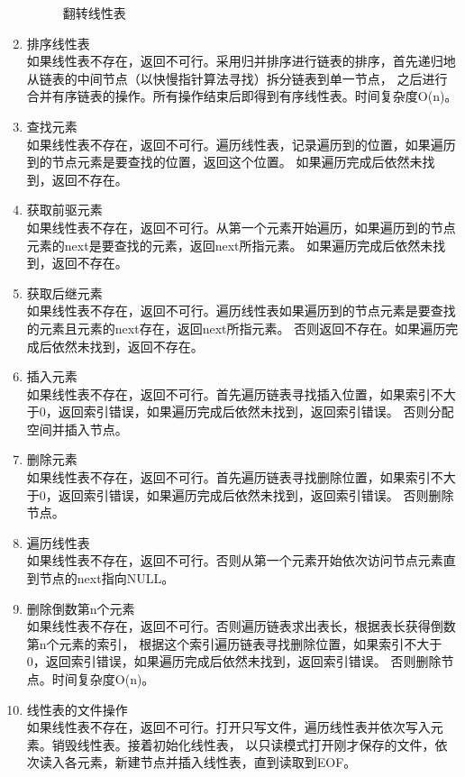 \documentclass[supercite]{Experimental_Report}
\theoremstyle{definition}
\begin{document}
\begin{enumerate}
\begin{figure}[htb]
\begin{center}
			\caption{翻转线性表}
			\label{fig1-1}
		\end{center}
	\end{figure}
	\newpage
	\item 排序线性表\\
	如果线性表不存在，返回不可行。采用归并排序进行链表的排序，首先递归地从链表的中间节点（以快慢指针算法寻找）拆分链表到单一节点，
	之后进行合并有序链表的操作。所有操作结束后即得到有序线性表。时间复杂度O(n)。
	\item 查找元素\\
	如果线性表不存在，返回不可行。遍历线性表，记录遍历到的位置，如果遍历到的节点元素是要查找的位置，返回这个位置。
	如果遍历完成后依然未找到，返回不存在。
	\item 获取前驱元素\\
	如果线性表不存在，返回不可行。从第一个元素开始遍历，如果遍历到的节点元素的next是要查找的元素，返回next所指元素。
	如果遍历完成后依然未找到，返回不存在。
	\item  获取后继元素\\
	如果线性表不存在，返回不可行。遍历线性表如果遍历到的节点元素是要查找的元素且元素的next存在，返回next所指元素。
	否则返回不存在。如果遍历完成后依然未找到，返回不存在。
	\item 插入元素\\
	如果线性表不存在，返回不可行。首先遍历链表寻找插入位置，如果索引不大于0，返回索引错误，如果遍历完成后依然未找到，返回索引错误。
	否则分配空间并插入节点。
	\item 删除元素\\
	如果线性表不存在，返回不可行。首先遍历链表寻找删除位置，如果索引不大于0，返回索引错误，如果遍历完成后依然未找到，返回索引错误。
	否则删除节点。
	\item 遍历线性表\\
	如果线性表不存在，返回不可行。否则从第一个元素开始依次访问节点元素直到节点的next指向NULL。
	\item 删除倒数第n个元素\\
	如果线性表不存在，返回不可行。否则遍历链表求出表长，根据表长获得倒数第n个元素的索引，
	根据这个索引遍历链表寻找删除位置，如果索引不大于0，返回索引错误，如果遍历完成后依然未找到，返回索引错误。
	否则删除节点。时间复杂度O(n)。
	\item 线性表的文件操作\\
	如果线性表不存在，返回不可行。打开只写文件，遍历线性表并依次写入元素。销毁线性表。接着初始化线性表，
	以只读模式打开刚才保存的文件，依次读入各元素，新建节点并插入线性表，直到读取到EOF。
\end{enumerate}
\end{document}
